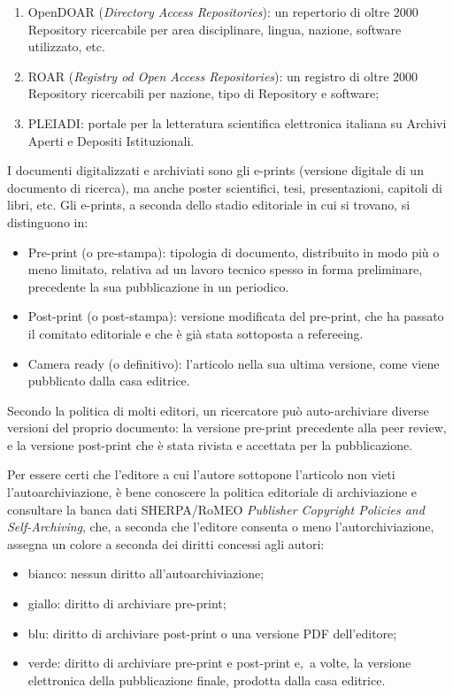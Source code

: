\documentclass[
  b5paper,
  twoside,
  12pt,
  chapterprefix=false,
  bibliography=totocnumbered,
  parskip=false]{scrbook}
\begin{document}
\begin{enumerate}
\def\labelenumi{\arabic{enumi}.}
\item
  OpenDOAR (\emph{Directory Access Repositories}): un repertorio di oltre
  2000 Repository ricercabile per area disciplinare, lingua, nazione,
  software utilizzato, etc.
\item
  ROAR (\emph{Registry od Open Access Repositories}): un registro di oltre
  2000 Repository ricercabili per nazione, tipo di Repository e
  software;
\item
  PLEIADI: portale per la letteratura scientifica elettronica italiana
  su Archivi Aperti e Depositi Istituzionali.
\end{enumerate}

I documenti digitalizzati e archiviati sono gli e-prints (versione
digitale di un documento di ricerca), ma anche poster scientifici, tesi,
presentazioni, capitoli di libri, etc. Gli e-prints, a seconda dello
stadio editoriale in cui si trovano, si distinguono in:

\begin{itemize}
\item
  Pre-print (o pre-stampa): tipologia di documento, distribuito in
  modo più o meno limitato, relativa ad un lavoro tecnico spesso in
  forma preliminare, precedente la sua pubblicazione in un periodico.
\item
  Post-print (o post-stampa): versione modificata del pre-print, che
  ha passato il comitato editoriale e che è già stata sottoposta a
  refereeing.
\item
  Camera ready (o definitivo): l'articolo nella sua ultima versione,
  come viene pubblicato dalla casa editrice.
\end{itemize}

Secondo la politica di molti editori, un ricercatore può auto-archiviare
diverse versioni del proprio documento: la versione pre-print precedente
alla peer review, e la versione post-print che è stata rivista e
accettata per la pubblicazione.

Per essere certi che l'editore a cui l'autore sottopone l'articolo non
vieti l'autoarchiviazione, è bene conoscere la politica editoriale di
archiviazione e consultare la banca dati SHERPA/RoMEO \emph{Publisher
Copyright Policies and Self-Archiving}, che, a seconda che l'editore
consenta o meno l'autorchiviazione, assegna un colore a seconda dei
diritti concessi agli autori:

\begin{itemize}
\item
  bianco: nessun diritto all'autoarchiviazione;
\item
  giallo: diritto di archiviare pre-print;
\item
  blu: diritto di archiviare post-print o una versione PDF
  dell'editore;
\item
  verde: diritto di archiviare pre-print e post-print e,~a volte, la
  versione elettronica della pubblicazione finale, prodotta dalla casa
  editrice.
\end{itemize}
\end{document}
